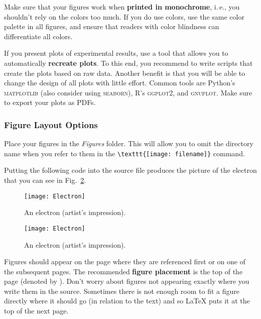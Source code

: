 Make sure that your figures work when \textbf{printed in monochrome}, i.\,e., you shouldn't rely on the colors too much. If you do use colors, use the same color palette in all figures, and ensure that readers with color blindness can differentiate all colors.

If you present plots of experimental results, use a tool that allows you to automatically \textbf{recreate plots}. To this end, you recommend to write scripts that create the plots based on raw data. Another benefit is that you will be able to change the design of all plots with little effort. Common tools are Python's \textsc{matplotlib} (also consider using \textsc{seaborn}), R's \textsc{ggplot2}, and \textsc{gnuplot}. Make sure to export your plots as PDFs.

\subsubsection{Figure Layout Options}

Place your figures in the \emph{Figures} folder. This will allow you to omit the directory name when you refer to them in the \verb|\texttt{[image: filename]}| command.

Putting the following code into the source file produces the picture of the electron that you can see in Fig.~\ref{fig:Electron}.
\begin{latex}
\begin{figure}[t] %
\centering
\texttt{[image: Electron]}
\decoRule
\caption[An Electron]{An electron (artist's impression).}
\label{fig:Electron}
\end{figure}
\end{latex}

\begin{figure}[t] %
\centering
\texttt{[image: Electron]}
\decoRule
\caption[An Electron]{An electron (artist's impression).}
\label{fig:Electron}
\end{figure}

Figures should appear on the page where they are referenced first or on one of the subsequent pages. The recommended \textbf{figure placement} is the top of the page (denoted by \code{[t]}). Don't worry about figures not appearing exactly where you write them in the source. Sometimes there is not enough room to fit a figure directly where it should go (in relation to the text) and so LaTeX puts it at the top of the next page.


